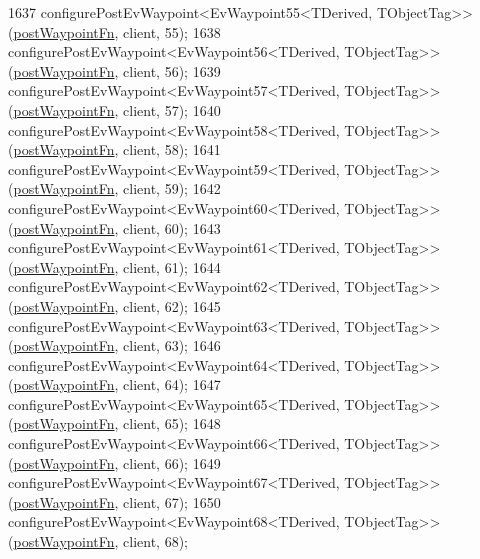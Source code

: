 \begin{DoxyCode}
1637     configurePostEvWaypoint<EvWaypoint55<TDerived, TObjectTag>>(\hyperlink{classmove__base__z__client_1_1WaypointEventDispatcher_acc538eb7506c13f7cca2268a1742dadd}{postWaypointFn}, client, 55);
1638     configurePostEvWaypoint<EvWaypoint56<TDerived, TObjectTag>>(\hyperlink{classmove__base__z__client_1_1WaypointEventDispatcher_acc538eb7506c13f7cca2268a1742dadd}{postWaypointFn}, client, 56);
1639     configurePostEvWaypoint<EvWaypoint57<TDerived, TObjectTag>>(\hyperlink{classmove__base__z__client_1_1WaypointEventDispatcher_acc538eb7506c13f7cca2268a1742dadd}{postWaypointFn}, client, 57);
1640     configurePostEvWaypoint<EvWaypoint58<TDerived, TObjectTag>>(\hyperlink{classmove__base__z__client_1_1WaypointEventDispatcher_acc538eb7506c13f7cca2268a1742dadd}{postWaypointFn}, client, 58);
1641     configurePostEvWaypoint<EvWaypoint59<TDerived, TObjectTag>>(\hyperlink{classmove__base__z__client_1_1WaypointEventDispatcher_acc538eb7506c13f7cca2268a1742dadd}{postWaypointFn}, client, 59);
1642     configurePostEvWaypoint<EvWaypoint60<TDerived, TObjectTag>>(\hyperlink{classmove__base__z__client_1_1WaypointEventDispatcher_acc538eb7506c13f7cca2268a1742dadd}{postWaypointFn}, client, 60);
1643     configurePostEvWaypoint<EvWaypoint61<TDerived, TObjectTag>>(\hyperlink{classmove__base__z__client_1_1WaypointEventDispatcher_acc538eb7506c13f7cca2268a1742dadd}{postWaypointFn}, client, 61);
1644     configurePostEvWaypoint<EvWaypoint62<TDerived, TObjectTag>>(\hyperlink{classmove__base__z__client_1_1WaypointEventDispatcher_acc538eb7506c13f7cca2268a1742dadd}{postWaypointFn}, client, 62);
1645     configurePostEvWaypoint<EvWaypoint63<TDerived, TObjectTag>>(\hyperlink{classmove__base__z__client_1_1WaypointEventDispatcher_acc538eb7506c13f7cca2268a1742dadd}{postWaypointFn}, client, 63);
1646     configurePostEvWaypoint<EvWaypoint64<TDerived, TObjectTag>>(\hyperlink{classmove__base__z__client_1_1WaypointEventDispatcher_acc538eb7506c13f7cca2268a1742dadd}{postWaypointFn}, client, 64);
1647     configurePostEvWaypoint<EvWaypoint65<TDerived, TObjectTag>>(\hyperlink{classmove__base__z__client_1_1WaypointEventDispatcher_acc538eb7506c13f7cca2268a1742dadd}{postWaypointFn}, client, 65);
1648     configurePostEvWaypoint<EvWaypoint66<TDerived, TObjectTag>>(\hyperlink{classmove__base__z__client_1_1WaypointEventDispatcher_acc538eb7506c13f7cca2268a1742dadd}{postWaypointFn}, client, 66);
1649     configurePostEvWaypoint<EvWaypoint67<TDerived, TObjectTag>>(\hyperlink{classmove__base__z__client_1_1WaypointEventDispatcher_acc538eb7506c13f7cca2268a1742dadd}{postWaypointFn}, client, 67);
1650     configurePostEvWaypoint<EvWaypoint68<TDerived, TObjectTag>>(\hyperlink{classmove__base__z__client_1_1WaypointEventDispatcher_acc538eb7506c13f7cca2268a1742dadd}{postWaypointFn}, client, 68);

\end{DoxyCode}
